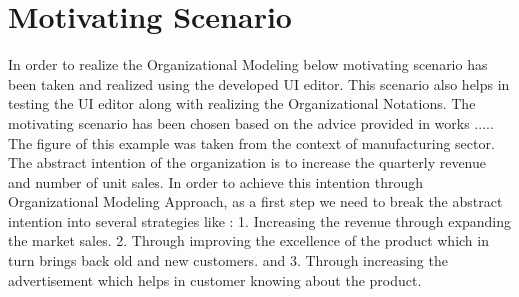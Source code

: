 \chapter{Motivating Scenario}
\label{chap:motivatingScenario}

In order to realize the Organizational Modeling  below motivating scenario has been taken and realized using the developed UI editor.
This scenario also helps in testing the UI editor along with realizing the Organizational Notations. The motivating scenario has been chosen based on the advice provided in works ..... The figure of this example was taken from the context of manufacturing sector. The abstract intention of the organization is to increase the quarterly revenue and number of unit sales. In order to achieve this intention through Organizational Modeling Approach, as a first step we need to break the abstract intention into several strategies like : 1. Increasing the revenue through expanding the market sales. 2. Through improving the excellence of the product which in turn brings back old and new customers. and 3. Through increasing the advertisement which helps in customer knowing about the product.  